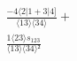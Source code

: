 \documentclass[varwidth, border=5pt]{standalone}
\begin{document}
\begin{my}
$\begin{gathered}
\scriptscriptstyle\frac{-4⟨2|1+3|4]}{⟨13⟩⟨34⟩} +\\
\scriptscriptstyle\frac{1⟨23⟩s_{123}}{⟨13⟩⟨34⟩²} \phantom{+}
\end{gathered}$
\end{my}
\end{document}
